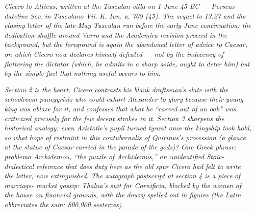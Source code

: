 
\textit{Cicero to Atticus, written at the Tusculan villa on 1 June
45 BC --- Perseus dateline \textit{Scr. in Tusculano Vii. K. Iun.
a. 709 (45)}. The sequel to 13.27 and the closing letter of the
late-May Tusculan run before the early-June continuation: the
dedication-shuffle around Varro and the \textit{Academica}
revision proceed in the background, but the foreground is again
the abandoned letter of advice to Caesar, on which Cicero now
declares himself defeated --- not by the indecency of flattering
the dictator (which, he admits in a sharp aside, ought to deter
him) but by the simple fact that nothing useful occurs to him.}

\textit{Section 2 is the heart: Cicero contrasts his blank
draftsman's slate with the schoolroom panegyrists who could
exhort Alexander to glory because their young king was ablaze
for it, and confesses that what he ``carved out of an oak'' was
criticized precisely for the few decent strokes in it. Section
3 sharpens the historical analogy: even Aristotle's pupil
turned tyrant once the kingship took hold, so what hope of
restraint in this \textit{contubernalis} of Quirinus's
procession (a glance at the statue of Caesar carried in the
parade of the gods)? One Greek phrase: \textit{probl\=ema
Archid\=emou}, ``the puzzle of Archidemus,'' an unidentified
Stoic-dialectical reference that does duty here as the old
spur Cicero had felt to write the letter, now extinguished.
The autograph postscript at section 4 is a piece of marriage-
market gossip: Thalna's suit for Cornificia, blocked by the
women of the house on financial grounds, with the dowry
spelled out in figures (the Latin abbreviates the sum: 800{,}000
sesterces).}
